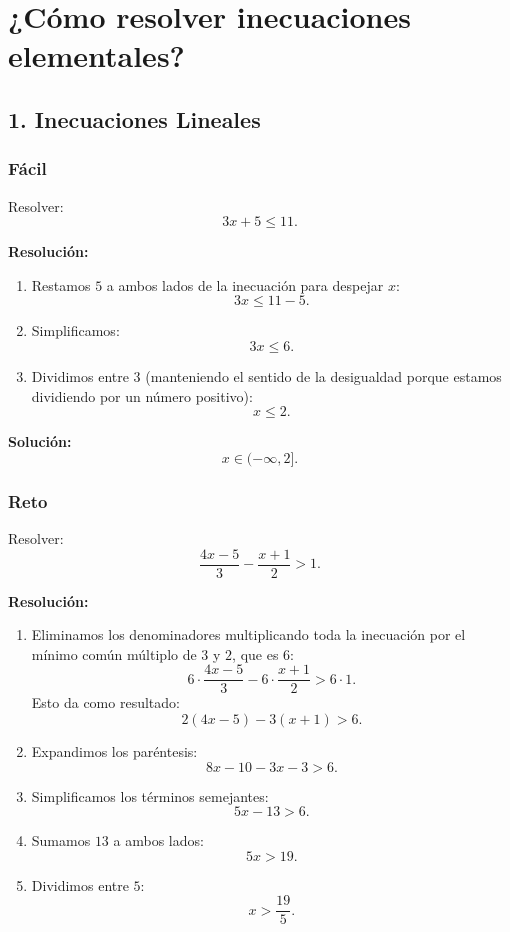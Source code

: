 \documentclass[a4,11pt]{aleph-notas}
\begin{document}
\section{¿Cómo resolver inecuaciones elementales?}

\subsection*{1. Inecuaciones Lineales}

\subsubsection*{Fácil}
Resolver:
$$
3x + 5 \leq 11.
$$

\textbf{Resolución:}
\begin{enumerate}
    \item Restamos \(5\) a ambos lados de la inecuación para despejar \(x\):
    $$
    3x \leq 11 - 5.
    $$
    \item Simplificamos:
    $$
    3x \leq 6.
    $$
    \item Dividimos entre \(3\) (manteniendo el sentido de la desigualdad porque estamos dividiendo por un número positivo):
    $$
    x \leq 2.
    $$
\end{enumerate}

\textbf{Solución:}
$$
x \in (-\infty, 2].
$$

\subsubsection*{Reto}
Resolver:
$$
\frac{4x - 5}{3} - \frac{x + 1}{2} > 1.
$$

\textbf{Resolución:}
\begin{enumerate}
    \item Eliminamos los denominadores multiplicando toda la inecuación por el mínimo común múltiplo de \(3\) y \(2\), que es \(6\):
    $$
    6 \cdot \frac{4x - 5}{3} - 6 \cdot \frac{x + 1}{2} > 6 \cdot 1.
    $$
    Esto da como resultado:
    $$
    2(4x - 5) - 3(x + 1) > 6.
    $$
    \item Expandimos los paréntesis:
    $$
    8x - 10 - 3x - 3 > 6.
    $$
    \item Simplificamos los términos semejantes:
    $$
    5x - 13 > 6.
    $$
    \item Sumamos \(13\) a ambos lados:
    $$
    5x > 19.
    $$
    \item Dividimos entre \(5\):
    $$
    x > \frac{19}{5}.
    $$
\end{enumerate}
\end{document}
